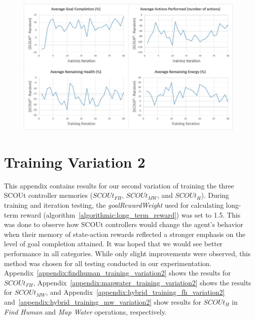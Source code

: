 \begin{appxfig}[H]
\begin{figure}[H]
  \centering
  \includegraphics[width=0.9\columnwidth]{Figures/Results/TrainingVariation1/Hybrid-MapWater.JPG}
\end{figure}
\caption{Iteration testing performance results for $SCOUt_{H}$ attempting \textit{Map Water} using setup variation 1 (see subsection~\ref{subsec:training_variations}). All graphs show the controller's average difference in performance compared to $Random$ ($SCOUt_{H}$ average - $Random$ average) VS the number of training iterations completed.}
\label{appendix:hybrid_training_mw_variation1}
\end{appxfig}







\pagebreak
\tocless\section{Training Variation 2} \label{sec:training_variation2}
This appendix contains results for our second variation of training the three SCOUt controller memories ($SCOUt_{FH}$, $SCOUt_{MW}$, and $SCOUt_{H}$).
During training and iteration testing, the \textit{goalRewardWeight} used for calculating long-term reward (algorithm~\ref{algorithmic:long_term_reward}) was set to 1.5.
This was done to observe how SCOUt controllers would change the agent's behavior when their memory of state-action rewards reflected a stronger emphasis on the level of goal completion attained.
It was hoped that we would see better performance in all categories.
While only slight improvements were observed, this method was chosen for all testing conducted in our experimentation.
Appendix~\ref{appendix:findhuman_training_variation2} shows the results for $SCOUt_{FH}$, Appendix~\ref{appendix:mapwater_training_variation2} shows the results for $SCOUt_{MW}$, and Appendix~\ref{appendix:hybrid_training_fh_variation2} and~\ref{appendix:hybrid_training_mw_variation2} show results for $SCOUt_{H}$ in \textit{Find Human} and \textit{Map Water} operations, respectively.

